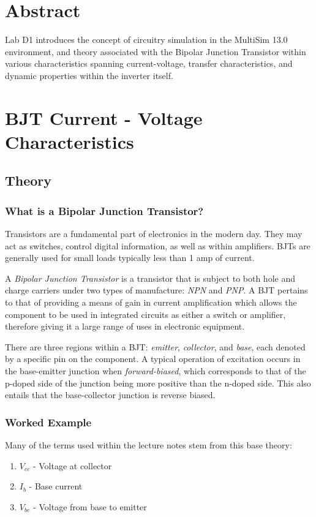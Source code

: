\documentclass[12pt]{article}
\begin{document}
\tableofcontents
{}
\thispagestyle{empty}
\cleardoublepage
\setcounter{page}{1}


\section{Abstract}
Lab D1 introduces the concept of circuitry simulation in the MultiSim 13.0 environment, and theory associated with the Bipolar Junction Transistor within various characteristics spanning current-voltage, transfer characteristics, and dynamic properties within the inverter itself.
\section{BJT Current - Voltage Characteristics}
\subsection{Theory}
\subsubsection{What is a Bipolar Junction Transistor?}
Transistors are a fundamental part of electronics in the modern day. They may act as switches, control digital information, as well as within amplifiers. BJTs are generally used for small loads typically less than 1 amp of current. 

A \emph{Bipolar Junction Transistor} is a transistor that is subject to both hole and charge carriers under two types of manufacture: \emph{NPN} and \emph{PNP}. A BJT pertains to that of providing a means of gain in current amplification which allows the component to be used in integrated circuits as either a switch or amplifier, therefore giving it a large range of uses in electronic equipment.

There are three regions within a BJT: \emph{emitter}, \emph{collector}, and \emph{base}, each denoted by a specific pin on the component. A typical operation of excitation occurs in the base-emitter junction when \emph{forward-biased}, which corresponds to that of the p-doped side of the junction being more positive than the n-doped side. This also entails that the base-collector junction is reverse biased.

\subsubsection{Worked Example}
Many of the terms used within the lecture notes stem from this base theory:
\begin{enumerate}
\item $V_{cc}$ - Voltage at collector
\item $I_{b}$ - Base current
\item $V_{be}$ - Voltage from base to emitter
\end{enumerate}
\end{document}
